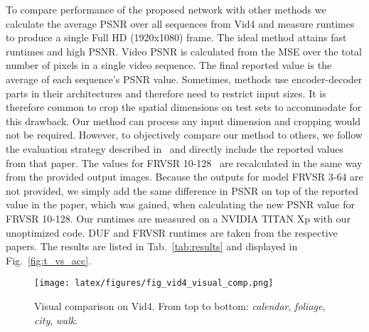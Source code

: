 \documentclass[10pt,twocolumn,letterpaper]{article}
\begin{document}
To compare performance of the proposed network with other methods we calculate the average PSNR over all sequences from Vid4 and measure runtimes to produce a single Full HD (1920x1080) frame. The ideal method attains fast runtimes and high PSNR.
Video PSNR is calculated from the MSE over the total number of pixels in a single video sequence. The final reported value is the average of each sequence's PSNR value. Sometimes, methods use encoder-decoder parts in their architectures and therefore need to restrict input sizes. It is therefore common to crop the spatial dimensions on test sets to accommodate for this drawback. Our method can process any input dimension and cropping would not be required. However, to objectively compare our method to others, we follow the evaluation strategy described in~\cite{duf} and directly include the reported values from that paper. The values for FRVSR 10-128~\cite{frvsr} are recalculated in the same way from the provided output images. Because the outputs for model FRVSR 3-64 are not provided, we simply add the same difference in PSNR on top of the reported value in the paper, which was gained, when calculating the new PSNR value for FRVSR 10-128. Our runtimes are measured on a NVIDIA TITAN Xp with our unoptimized code. DUF and FRVSR runtimes are taken from the respective papers. The results are listed in Tab.~\ref{tab:results} and displayed in Fig.~\ref{fig:t_vs_acc}.



\begin{figure*}[th!]
\begin{center}
 \par\medskip
\texttt{[image: latex/figures/fig\_vid4\_visual\_comp.png]}
\end{center}
\vspace{-0.15cm}
   \caption{Visual comparison on Vid4. From top to bottom: \textit{calendar}, \textit{foliage}, \textit{city}, \textit{walk}.}
\label{fig:vid4_comparison}
\end{figure*}
\end{document}
